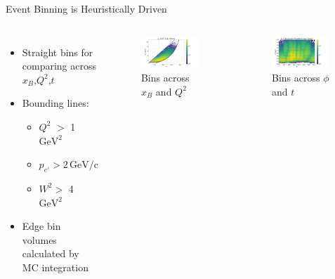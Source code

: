 \documentclass[aspectratio=169]{beamer}
\begin{document}
\begin{frame}{Event Binning is Heuristically Driven}

\begin{columns}
        \begin{itemize}
            \item Straight bins for comparing across $x_B$,$Q^2$,$t$
            \item Bounding lines:
            \begin{itemize}
                \item  $Q^2$ $>$ 1 $\text{GeV}^2$
                \item $p_{e'} > 2 \, \text{GeV/c}$
                \item $W^2 > $ 4 $\text{GeV}^2$
            \end{itemize}
            \item Edge bin volumes calculated by MC integration
        \end{itemize}
            \begin{figure}
                \centering
                \includegraphics[trim={0 0 7.5cm 0},clip,width=0.97\textwidth]{defense/x_B_vs_Q2,_Exp_Inbend.png}
                \caption{Bins across $x_B$ and $Q^2$}
            \end{figure}
            \begin{figure}
                \centering
                \includegraphics[trim={0 0 7.5cm 0},clip,width=0.97\textwidth]{defense/phi_vs_Momentum_Transfer_t,_Exp_Inbend.png}
                \caption{Bins across $\phi$ and $t$}
            \end{figure}

\end{columns}
\end{frame}
\end{document}
